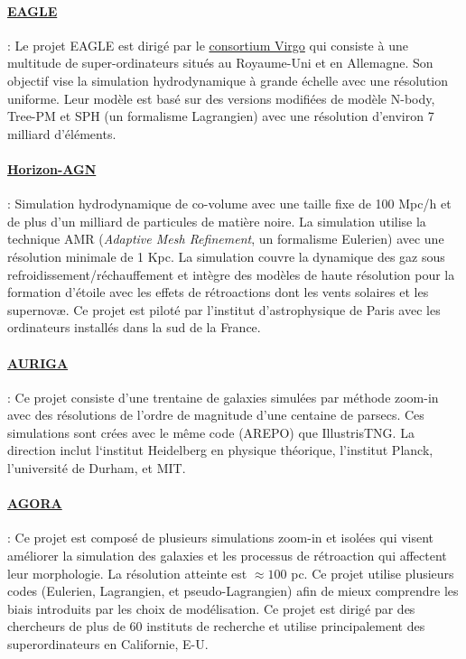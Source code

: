 \documentclass{article}
\begin{document}
\paragraph{\href{https://eagle.strw.leidenuniv.nl/wordpress/}{EAGLE}} \cite{Schaye_2014} : Le projet EAGLE est dirigé par le \href{https://virgo.dur.ac.uk/}{consortium Virgo}  qui consiste à une multitude de super-ordinateurs situés au Royaume-Uni et en Allemagne. Son objectif vise la simulation hydrodynamique à grande échelle avec une résolution uniforme. Leur modèle est  basé sur des versions modifiées de modèle N-body, Tree-PM et SPH (un formalisme Lagrangien) avec une résolution d’environ 7 milliard d’éléments. 

\paragraph{\href{https://www.horizon-simulation.org/}{Horizon-AGN}} \citep{Horizon}: Simulation hydrodynamique de co-volume avec une taille fixe de 100 Mpc/h et de plus d’un milliard de particules de matière noire. La simulation utilise la technique AMR (\textit{Adaptive Mesh Refinement}, un formalisme Eulerien) avec une résolution minimale de 1 Kpc. La simulation couvre la  dynamique des gaz sous refroidissement/réchauffement et intègre des modèles de haute résolution pour la formation d’étoile avec les effets de rétroactions dont les vents solaires et les supernovæ. Ce projet est piloté par l’institut d’astrophysique de Paris avec les ordinateurs installés dans la sud de la France.

\paragraph{\href{https://wwwmpa.mpa-garching.mpg.de/auriga/}{AURIGA}} \citep{Auriga_zoom}: Ce projet consiste d'une trentaine de galaxies simulées par méthode zoom-in avec des résolutions de l'ordre de magnitude d'une centaine de parsecs. Ces simulations sont crées avec le même code (AREPO) que IllustrisTNG. La direction inclut l‘institut Heidelberg en physique théorique, l’institut Planck, l’université de Durham, et MIT.

\paragraph{\href{https://sites.google.com/site/santacruzcomparisonproject/}{AGORA}} \citep{AGORA} : Ce projet est composé de plusieurs simulations zoom-in \citep{AGORA_zoom} et isolées \citep{AGORA_isolee} qui visent améliorer la simulation des galaxies et les processus de rétroaction qui affectent leur morphologie. La résolution atteinte est $\approx 100$ pc. Ce projet utilise plusieurs codes (Eulerien, Lagrangien, et pseudo-Lagrangien) afin de mieux comprendre les biais introduits par les choix de modélisation. Ce projet est dirigé par des chercheurs de plus de 60 instituts de recherche et utilise principalement des superordinateurs en Californie, E-U. 
\end{document}
